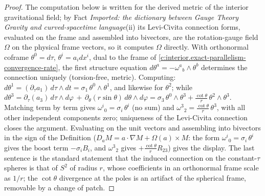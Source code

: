 \documentclass[11pt]{article}
\theoremstyle{definition}
\theoremstyle{plain}
\begin{document}
\begin{proof}
The computation below is written for the derived metric of the interior gravitational field; by Fact \emph{Imported: the dictionary between Gauge Theory Gravity and curved-spacetime language}(ii) its Levi-Civita connection forms, evaluated on the frame and assembled into bivectors, are the rotation-gauge field $\Omega$ on the physical frame vectors, so it computes $\Omega$ directly. With orthonormal coframe $\theta^0 = d\tau$, $\theta^i = a_i dx^i$, dual to the frame of \ref{c:interior.exact-parallelism-convergence-rate}, the first structure equation $d\theta^a = -\omega^a{}_b \wedge \theta^b$ determines the connection uniquely (torsion-free, metric). Computing: $d\theta^1 = (\partial_\tau a_1)\,d\tau \wedge dt = \sigma_1\,\theta^0 \wedge \theta^1$, and likewise for $\theta^2$; while $d\theta^3 = \partial_\tau(a_3)\,d\tau\wedge d\varphi\,+\,\partial_\theta(r\sin\theta)\,d\theta \wedge d\varphi = \sigma_3\,\theta^0\wedge\theta^3 + \frac{\cot\theta}{r}\,\theta^2 \wedge \theta^3$. Matching term by term gives $\omega^i{}_0 = \sigma_i\,\theta^i$ (no sum) and $\omega^3{}_2 = \frac{\cot\theta}{r}\,\theta^3$, with all other independent components zero; uniqueness of the Levi-Civita connection closes the argument. Evaluating on the unit vectors and assembling into bivectors in the sign of the Definition ($D_a M = a \cdot \nabla M + \Omega(a) \times M$: the form $\omega^i{}_0 = \sigma_i\,\theta^i$ gives the boost term $-\sigma_i B_i$, and $\omega^3{}_2$ gives $+\frac{\cot\theta}{r}R_{23}$) gives the display. The last sentence is the standard statement that the induced connection on the constant-$\tau$ spheres is that of $S^2$ of radius $r$, whose coefficients in an orthonormal frame scale as $1/r$; the $\cot\theta$ divergence at the poles is an artifact of the spherical frame, removable by a change of patch.

\end{proof}
\end{document}

